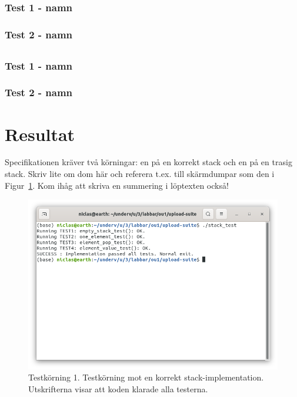 \documentclass[10pt, titlepage, oneside, a4paper]{article}
\begin{document}
\subsection{}

\subsubsection{Test 1 - namn}

\subsubsection{Test 2 - namn}

\subsection{}

\subsubsection{Test 1 - namn}

\subsubsection{Test 2 - namn}

\section{Resultat}

Specifikationen kräver två körningar: en på en korrekt stack och en på
en trasig stack. Skriv lite om dom här och referera t.ex. till
skärmdumpar som den i Figur~\ref{fig:ok-run}. Kom ihåg att skriva en
summering i löptexten också!

\begin{figure}
  \begin{center}
    \includegraphics[width=0.6\hsize]{screendump-ok.png}
  \end{center}
  \caption{Testkörning 1. Testkörning mot en korrekt
    stack-implementation. Utskrifterna visar att koden klarade alla
    testerna.}
  \label{fig:ok-run}
\end{figure}
\end{document}
